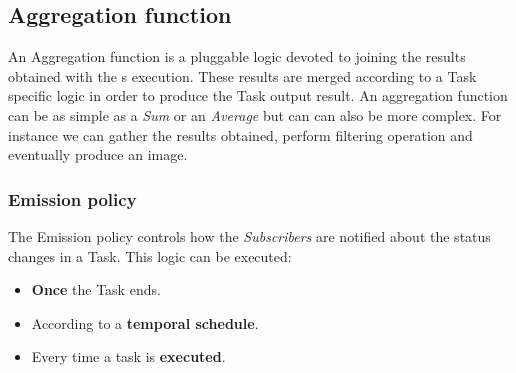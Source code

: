 \subsection{Aggregation function}
An Aggregation function is a pluggable logic devoted to joining the results
obtained with the \utask{}s execution. These results are merged according to a
Task specific logic in order to produce the Task output result. An aggregation
function can be as simple as a \emph{Sum} or an \emph{Average} but can can also
be more complex. For instance we can gather the results obtained, perform
filtering operation and eventually produce an image.


\subsubsection{Emission policy}
The Emission policy controls how the \emph{Subscribers} are notified about the
status changes in a Task. This logic can be executed:
\begin{itemize}
    \item \textbf{Once} the Task ends.

    \item According to a \textbf{temporal schedule}.

    \item Every time a task is \textbf{executed}.
\end{itemize}
